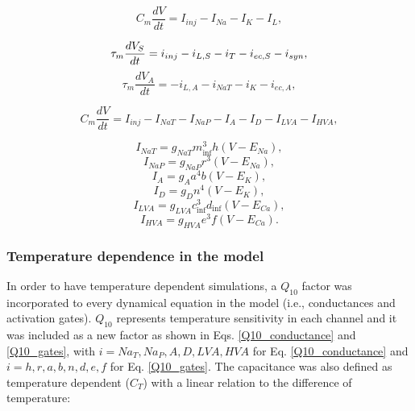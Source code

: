 \begin{equation}
    C_m\frac{dV}{dt} = I_{inj} - I_{Na} - I_K - I_L,
    \label{eq:hh}
\end{equation}

\begin{equation}
    \tau_m\frac{dV_S}{dt} = i_{inj} - i_{L,S} - i_T - i_{ec,S} - i_{syn}\\,
    \label{eq:soma}
\end{equation}
\begin{equation}
    \tau_m\frac{dV_A}{dt} = -i_{L,A} - i_{NaT} - i_K - i_{ec,A},
    \label{eq:axon}
\end{equation}

\begin{equation}
    C_m\frac{dV}{dt} = I_{inj} - I_{NaT} - I_{NaP} - I_{A} - I_{D} - I_{LVA} - I_{HVA},
    \label{eq:voltage}
\end{equation}

\begin{equation}
I_{NaT} = g_{NaT} m_{\inf}^3 h (V - E_{Na}),
\end{equation}
\begin{equation}
I_{NaP} = g_{NaP} r^3 (V - E_{Na}),
\end{equation}
\begin{equation}
I_{A} = g_{A} a^4 b (V - E_{K}),
\end{equation}
\begin{equation}
I_{D} = g_{D} n^4 (V - E_{K}),
\end{equation}
\begin{equation}
I_{LVA} = g_{LVA} c_{\inf}^3 d_{\inf} (V - E_{Ca}),
\end{equation}
\begin{equation}
I_{HVA} = g_{HVA} e^3 f (V - E_{Ca}).
\label{eq:channels}
\end{equation}

\subsubsection{Temperature dependence in the model}
\label{sec:model equations temperature}
In order to have temperature dependent simulations, a $Q_{10}$ factor was incorporated to every dynamical equation in the model (i.e., conductances and activation gates). $Q_{10}$ represents temperature sensitivity in each channel and it was included as a new factor as shown in Eqs. \ref{Q10_conductance} and \ref{Q10_gates}, with $i=Na_T,Na_P,A,D,LVA,HVA$ for Eq. \ref{Q10_conductance} and $i=h,r,a,b,n,d,e,f$ for Eq. \ref{Q10_gates}. The capacitance was also defined as temperature dependent ($C_T$) with a linear relation to the difference of temperature: 

